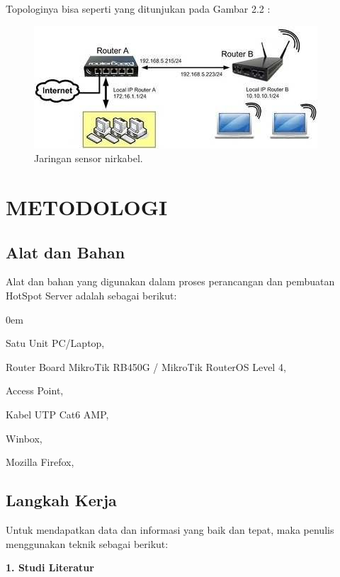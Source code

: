 \documentclass{jtetiproposalskripsi}
\begin{document}
Topologinya bisa seperti yang ditunjukan pada Gambar 2.2 :

\begin{figure}[ht!]
  \centering
    \includegraphics{gambar/2}
    \caption{Jaringan sensor nirkabel.}
    \label{2}
\end{figure}


\chapter{METODOLOGI}

\section{Alat dan Bahan}
Alat dan bahan yang digunakan dalam proses perancangan dan pembuatan HotSpot Server adalah sebagai berikut:


\vspace{-0.5cm}

\begin{enumerate}[1.]
\begin{singlespace}
\itemsep0em
\item Satu Unit PC/Laptop,
\item Router Board MikroTik RB450G / MikroTik RouterOS Level 4,
\item Access Point,
\item Kabel UTP Cat6 AMP,
\item Winbox,
\item Mozilla Firefox,
\end{singlespace}
\end{enumerate}

\section{Langkah Kerja}
Untuk mendapatkan data dan informasi yang baik dan tepat, maka penulis menggunakan teknik sebagai berikut:

\textbf{1. Studi Literatur}
\end{document}
